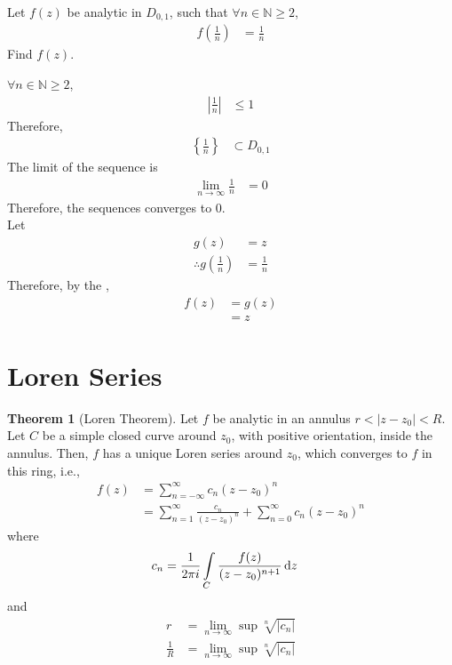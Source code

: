 \documentclass[titlepage, fleqn, a4paper, 12pt, twoside]{article}
\theoremstyle{definition}
\theoremstyle{theorem}
\newtheorem{theorem}{Theorem}
\begin{document}
\begin{question}
	Let $f(z)$ be analytic in $D_{0,1}$, such that $\forall n \in \mathbb{N} \ge 2$,
	\begin{align*}
		f\left( \frac{1}{n} \right) & = \frac{1}{n}
	\end{align*}
	Find $f(z)$.
\end{question}

\begin{solution}
	$\forall n \in \mathbb{N} \ge 2$,
	\begin{align*}
		\left| \frac{1}{n} \right| & \le 1
	\end{align*}
	Therefore,
	\begin{align*}
		\left\{ \frac{1}{n} \right\} & \subset D_{0,1}
	\end{align*}
	The limit of the sequence is
	\begin{align*}
		\lim\limits_{n \to \infty} \frac{1}{n} & = 0
	\end{align*}
	Therefore, the sequences converges to $0$.\\
	Let
	\begin{align*}
		g(z)                                   & = z \\
		\therefore g\left( \frac{1}{n} \right) & = \frac{1}{n}
	\end{align*}
	Therefore, by the ,
	\begin{align*}
		f(z) & = g(z) \\
                     & = z
	\end{align*}
\end{solution}

\section{Loren Series}

\begin{theorem}[Loren Theorem]
	Let $f$ be analytic in an annulus $r < |z - z_0| < R$.
	Let $C$ be a simple closed curve around $z_0$, with positive orientation, inside the annulus.
	Then, $f$ has a unique Loren series around $z_0$, which converges to $f$ in this ring, i.e.,
	\begin{align*}
		f(z) & = \sum\limits_{n = -\infty}^{\infty} c_n (z - z_0)^n \\
                     & = \sum\limits_{n = 1}^{\infty} \frac{c_n}{(z - z_0)^n} + \sum\limits_{n = 0}^{\infty} c_n (z - z_0)^n
	\end{align*}
	where
	\begin{align*}
		c_n & = \frac{1}{2 \pi i} \int\limits_{C} \frac{f(z)}{(z - z_0)^{n + 1}} \dif z
	\end{align*}
	and
	\begin{align*}
		r           & = \lim\limits_{n \to \infty} \sup \sqrt[n]{|c_n|} \\
		\frac{1}{R} & = \lim\limits_{n \to \infty} \sup \sqrt[n]{|c_n|}
	\end{align*}
	\label{thm:Loren_Theorem}
\end{theorem}
\end{document}
